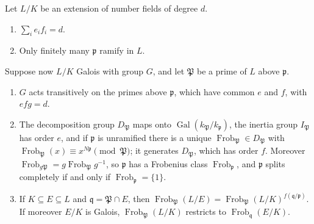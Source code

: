 \begin{proposition}\label{prop:relative}
Let $L/K$ be an extension of number fields of degree $d$.
\begin{enumerate}[label=(\alph*)]
\item $\sum_ie_if_i=d$.
\item Only finitely many $\mathfrak p$ ramify in $L$.
\end{enumerate}
Suppose now $L/K$ Galois with group $G$, and let $\mathfrak P$ be a prime of $L$ above $\mathfrak p$.
\begin{enumerate}[label=(\alph*),resume]
\item $G$ acts transitively on the primes above $\mathfrak p$, which have common $e$ and $f$, with $efg=d$.
\item The decomposition group $D_{\mathfrak P}$ maps onto $\operatorname{Gal}(k_{\mathfrak P}/k_{\mathfrak p})$, the inertia group $I_{\mathfrak P}$ has
order $e$, and if $\mathfrak p$ is unramified there is a unique $\operatorname{Frob}_{\mathfrak P}\in D_{\mathfrak P}$ with
$\operatorname{Frob}_{\mathfrak P}(x)\equiv x^{N\mathfrak p}\pmod{\mathfrak P}$; it generates $D_{\mathfrak P}$, which has order $f$. Moreover
$\operatorname{Frob}_{g\mathfrak P}=g\operatorname{Frob}_{\mathfrak P}g^{-1}$, so $\mathfrak p$ has a Frobenius class
$\operatorname{Frob}_{\mathfrak p}$, and $\mathfrak p$ splits completely if and only if $\operatorname{Frob}_{\mathfrak p}=\{1\}$.
\item If $K\subseteq E\subseteq L$ and $\mathfrak q=\mathfrak P\cap E$, then $\operatorname{Frob}_{\mathfrak P}(L/E)=\operatorname{Frob}_{\mathfrak
P}(L/K)^{f(\mathfrak q/\mathfrak p)}$. If moreover $E/K$ is Galois, $\operatorname{Frob}_{\mathfrak P}(L/K)$ restricts to
$\operatorname{Frob}_{\mathfrak q}(E/K)$.
\end{enumerate}
\end{proposition}
